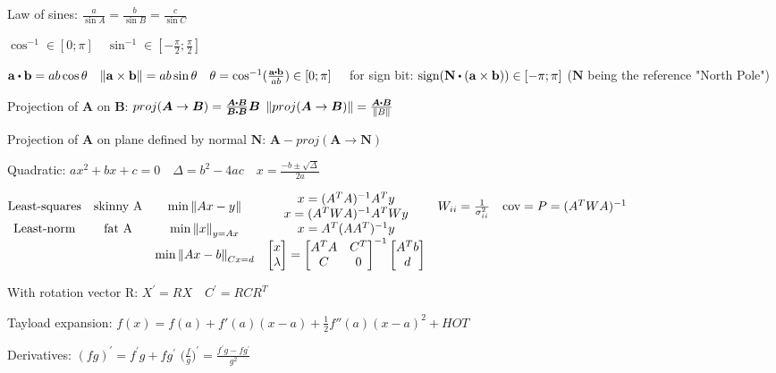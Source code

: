\documentclass[11pt,landscape]{article}
\begin{document}
Law of sines:
$
\frac{a}{\sin{A}} =
\frac{b}{\sin{B}} =
\frac{c}{\sin{C}}
$

$
\cos^{-1} \in [0; \pi]
\quad
\sin^{-1} \in [-\frac{\pi}{2}; \frac{\pi}{2}]
$

$
\mathbf{a} \dotp \mathbf{b} = a b \cos{\theta}
\quad
\lVert \mathbf{a} \times \mathbf{b} \rVert = a b \sin{\theta}
\quad
\theta = \cos^{-1}({\frac{\mathbf{a} \dotp \mathbf{b}}{ab}}) \in [0; \pi]
\quad
$
for sign bit:
$
\text{sign}( \mathbf{N} \dotp (\mathbf{a} \times \mathbf{b})) \in [-\pi; \pi]
$
($\mathbf{N}$ being the reference "North Pole")

Projection of $\bm A$ on $\bm B$:
$proj(\bm A \rightarrow \bm B) = \frac{\bm A \dotp \bm B}{\bm B \dotp \bm B} \bm B$
\quad
$\norm{proj(\bm A \rightarrow \bm B)} = \frac{\bm A \dotp \bm B}{\norm{B}}$

Projection of $\bm A$ on plane defined by normal $\bm N$:
$\bm A - proj(\bm A \rightarrow \bm N)$

Quadratic:
$
ax^2 + bx + c = 0
\quad
\Delta = b^2 - 4ac
\quad
x = \frac{-b \pm \sqrt{\Delta}}{2a}
$

$
\begin{matrix}
\text{Least-squares} & \text{skinny A} & \text{min} \left\lVert Ax-y \right\rVert & 
	\begin{matrix} x = (A^TA)^{-1}A^Ty \\ x = (A^TWA)^{-1}A^TWy \end{matrix} &
	W_{ii}=\frac{1}{\sigma_{ii}^2} \quad \text{cov} = P = (A^TWA)^{-1} \\
\text{Least-norm} & \text{fat A} & \text{min} \left\lVert x \right\rVert_{y=Ax} & x = A^T(AA^T)^{-1}y \\
	&  & \text{min}\left\lVert Ax-b \right\rVert_{Cx=d} & 
	\begin{bmatrix} x \\ \lambda \end{bmatrix} =
	\begin{bmatrix} A^TA & C^T \\ C & 0 \end{bmatrix}^{-1}
	\begin{bmatrix} A^Tb \\ d \end{bmatrix}
\end{matrix}
$

With rotation vector R:
$X^\prime = RX \quad C^\prime = RCR^T$

Tayload expansion:
$
f(x) = f(a) + f'(a)(x-a) + \frac{1}{2}f''(a)(x-a)^2 + HOT
$

Derivatives:
$(fg)^\prime = f^\prime g + fg^\prime$
\quad
$\big( \frac{f}{g} \big)^\prime = \frac{f^\prime g - fg^\prime}{g^2}$
\end{document}
